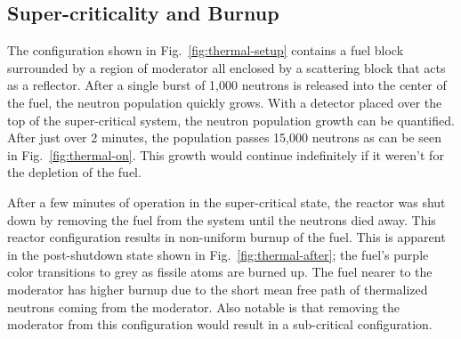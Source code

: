 \documentclass{anstrans}
\newcommand{\Fig}{Fig.~}
\begin{document}
\subsection{Super-criticality and Burnup}

The configuration shown in \Fig \ref{fig:thermal-setup} contains a fuel
block surrounded by a region of moderator all enclosed by a scattering block
that acts as a reflector.  After a single burst of 1,000 neutrons is released
into the center of the fuel, the neutron population quickly grows.  With a
detector placed over the top of the super-critical system, the neutron
population growth can be quantified. After just over 2 minutes, the population
passes 15,000 neutrons as can be seen in \Fig \ref{fig:thermal-on}.  This
growth would continue indefinitely if it weren't for the depletion of the
fuel.

After a few minutes of operation in the super-critical state, the reactor was
shut down by removing the fuel from the system until the neutrons died away.
This reactor configuration results in non-uniform burnup of the fuel. This is
apparent in the post-shutdown state shown in \Fig \ref{fig:thermal-after};
the fuel's purple color transitions to grey as fissile atoms are burned up.
The fuel nearer to the moderator has higher burnup due to the short mean free
path of thermalized neutrons coming from the moderator.  Also notable is that
removing the moderator from this configuration would result in a sub-critical
configuration. 
\end{document}
